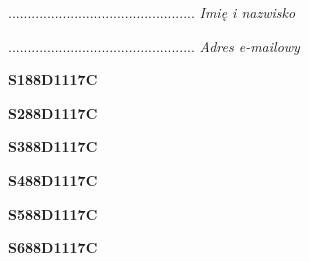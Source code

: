 \begin{turn}{90}\begin{minipage}{\linewidth} \vspace{20mm} ................................................  \textit{Imię i nazwisko}\end{minipage}\end{turn}

\begin{turn}{90}\begin{minipage}{\linewidth} \vspace{20mm} ................................................  \textit{Adres e-mailowy}\end{minipage}\end{turn}

\begin{turn}{90}\huge \begin{minipage}{\linewidth} \vspace{10mm}\textbf{S188D1117C}\end{minipage}\end{turn}

\begin{turn}{90}\huge \begin{minipage}{\linewidth} \vspace{10mm}\textbf{S288D1117C}\end{minipage}\end{turn}

\begin{turn}{90}\huge \begin{minipage}{\linewidth} \vspace{10mm}\textbf{S388D1117C}\end{minipage}\end{turn}

\begin{turn}{90}\huge \begin{minipage}{\linewidth} \vspace{10mm}\textbf{S488D1117C}\end{minipage}\end{turn}

\begin{turn}{90}\huge \begin{minipage}{\linewidth} \vspace{10mm}\textbf{S588D1117C}\end{minipage}\end{turn}

\begin{turn}{90}\huge \begin{minipage}{\linewidth} \vspace{10mm}\textbf{S688D1117C}\end{minipage}\end{turn}

